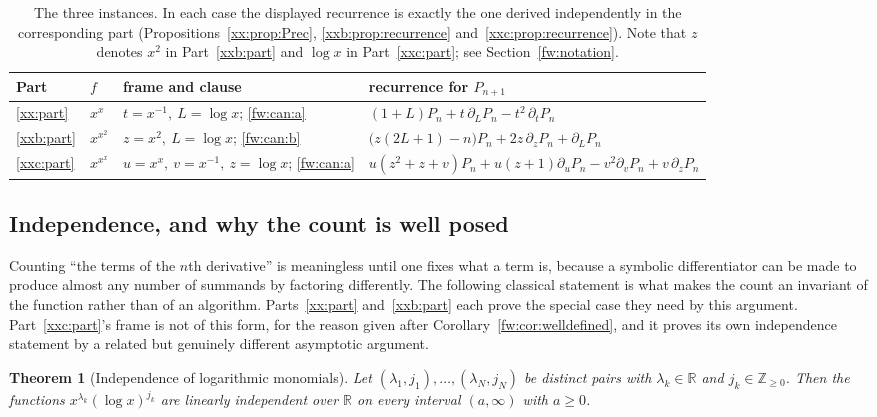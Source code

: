 \documentclass[11pt,a4paper]{article}
\numberwithin{equation}{section}
\newtheorem{theorem}{Theorem}[section]
\theoremstyle{definition}
\theoremstyle{remark}
\theoremstyle{plain}
\newcommand{\Z}{\mathbb Z}
\newcommand{\R}{\mathbb R}
\begin{document}
\begin{table}[htbp]
\centering
\small
\begin{tabular}{@{}llll@{}}
\toprule
Part & $f$ & frame and clause & recurrence for $P_{n+1}$\\
\midrule
\ref{xx:part} & $x^{x}$ &
 $t=x^{-1},\ L=\log x$; \ref{fw:can:a} &
 $(1+L)P_n+t\,\partial_LP_n-t^2\,\partial_tP_n$\\[2pt]
\ref{xxb:part} & $x^{x^2}$ &
 $z=x^2,\ L=\log x$; \ref{fw:can:b} &
 $\bigl(z(2L+1)-n\bigr)P_n+2z\,\partial_zP_n+\partial_LP_n$\\[2pt]
\ref{xxc:part} & $x^{x^x}$ &
 $u=x^x,\ v=x^{-1},\ z=\log x$; \ref{fw:can:a} &
 $u(z^2{+}z{+}v)P_n+u(z{+}1)\partial_uP_n-v^2\partial_vP_n+v\,\partial_zP_n$\\
\bottomrule
\end{tabular}
\caption{The three instances.  In each case the displayed recurrence is exactly
the one derived independently in the corresponding part
(Propositions~\ref{xx:prop:Prec}, \ref{xxb:prop:recurrence}
and~\ref{xxc:prop:recurrence}).  Note that $z$ denotes $x^2$ in
Part~\ref{xxb:part} and $\log x$ in Part~\ref{xxc:part}; see
Section~\ref{fw:notation}.}
\label{fw:tab:instances}
\end{table}

\subsection{Independence, and why the count is well posed}\label{fw:independence}

Counting ``the terms of the $n$th derivative'' is meaningless until one fixes
what a term is, because a symbolic differentiator can be made to produce almost
any number of summands by factoring differently.  The following classical
statement is what makes the count an invariant of the function rather than of an
algorithm.  Parts~\ref{xx:part} and~\ref{xxb:part} each prove the special case
they need by this argument.  Part~\ref{xxc:part}'s frame is not of this form,
for the reason given after Corollary~\ref{fw:cor:welldefined}, and it proves its
own independence statement by a related but genuinely different asymptotic
argument.

\begin{theorem}[Independence of logarithmic monomials]\label{fw:thm:independence}
Let $(\lambda_1,j_1),\dots,(\lambda_N,j_N)$ be distinct pairs with
$\lambda_k\in\R$ and $j_k\in\Z_{\ge0}$.  Then the functions
$x^{\lambda_k}(\log x)^{j_k}$ are linearly independent over $\R$ on every
interval $(a,\infty)$ with $a\ge0$.
\end{theorem}
\end{document}
